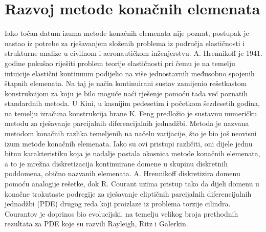 \documentclass[a4paper,twoside,12pt]{memoir} %
\begin{document}
\section{Razvoj metode konačnih elemenata}
Iako točan datum izuma metode konačnih elemenata nije poznat, postupak je nastao iz potrebe za rješavanjem složenih problema iz područja elastičnosti i strukturne analize u civilnom i aeronautičkom inženjerstvu. A. Hrennikoff je 1941. godine pokušao riješiti problem teorije elastičnosti pri čemu je na temelju intuicije elastični kontinuum podijelio na više jednostavnih međusobno spojenih štapnih elemenata. Na taj je način kontinuirani sustav zamijenio rešetkastom konstrukcijom za koju je bilo moguće naći rješenje pomoću tada već poznatih standardnih metoda. U Kini, u kasnijim pedesetim i početkom šezdesetih godina, na temelju izračuna konstrukcija brane K. Feng predložio je sustavnu numeričku metodu za rješavanje parcijalnih diferencijalnih jednadžbi. Metoda je nazvana metodom konačnih razlika temeljenih na načelu varijacije, što je bio još neovisni izum metode konačnih elemenata. Iako su ovi pristupi različiti, oni dijele jednu bitnu karakteristiku koja je nadalje postala okosnica metode konačnih elemenata, a to je mrežna diskretizacija kontinuirane domene u skupinu diskretnih poddomena, obično nazvanih elemenata. A. Hrennikoff diskretizira domenu pomoću analogije rešetke, dok R. Courant uzima pristup tako da dijeli domenu u konačne trokutaste podregije za rješavanje eliptičnih parcijalnih diferencijalnih jednadžbi (PDE) drugog reda koji proizlaze iz problema torzije cilindra. Courantov je doprinos bio evolucijski, na temelju velikog broja prethodnih rezultata za PDE koje su razvili Rayleigh, Ritz i Galerkin. \cite{wiki_fem_4} \cite{wiki_fem_5} \par
\end{document}
